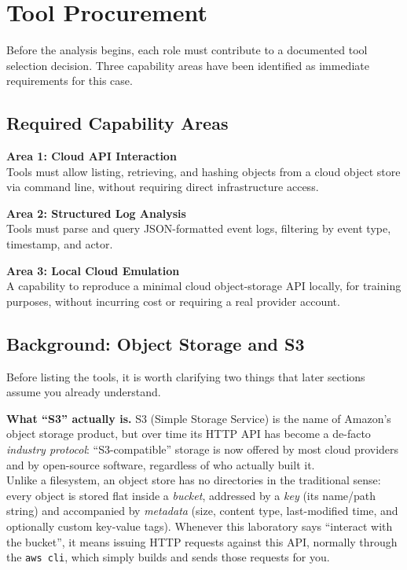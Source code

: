 \section{Tool Procurement}

Before the analysis begins, each role must contribute to a documented tool selection decision. Three capability areas have been identified as immediate requirements for this case.

\subsection{Required Capability Areas}

\textbf{Area 1: Cloud API Interaction}\\
Tools must allow listing, retrieving, and hashing objects from a cloud object store via command
line, without requiring direct infrastructure access.
\medskip

\noindent
\textbf{Area 2: Structured Log Analysis}\\
Tools must parse and query JSON-formatted event logs, filtering by event type, timestamp, and
actor.
\medskip

\noindent
\textbf{Area 3: Local Cloud Emulation}\\
A capability to reproduce a minimal cloud object-storage API locally, for training purposes,
without incurring cost or requiring a real provider account.

\subsection{Background: Object Storage and S3}

Before listing the tools, it is worth clarifying two things that later sections assume you
already understand.
\medskip

\noindent
\textbf{What ``S3'' actually is.} S3 (Simple Storage Service) is the name of Amazon's object
storage product, but over time its HTTP API has become a de-facto \emph{industry protocol}:
``S3-compatible'' storage is now offered by most cloud providers and by open-source software, regardless of who actually built it. \\
Unlike a filesystem, an object store has no directories in the traditional sense: every object is stored flat inside a \emph{bucket}, addressed by a \emph{key} (its name/path string) and accompanied by \emph{metadata} (size, content type, last-modified time, and optionally custom key-value tags). Whenever this laboratory says ``interact with the bucket'', it means issuing HTTP requests against this API, normally through the \texttt{aws cli}, which simply builds and sends those requests for you.
\medskip

